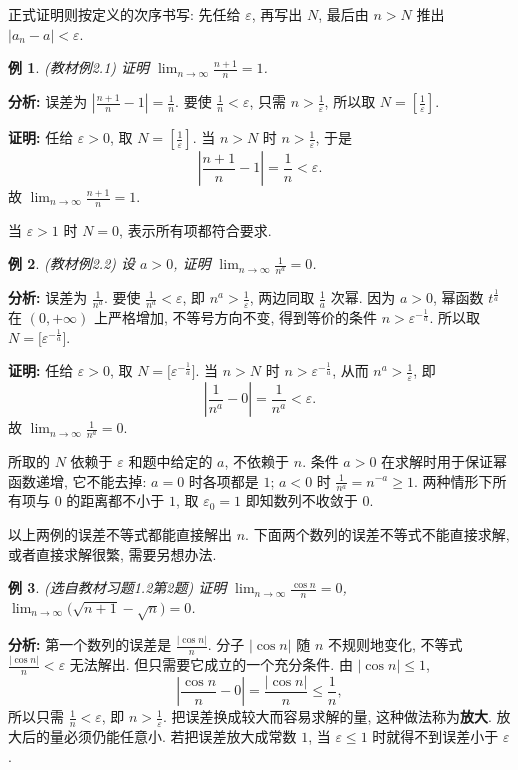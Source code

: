 \documentclass[UTF8,openany]{ctexbook}
\theoremstyle{chinesetextbook}
\newtheorem{example}{例}[section]
\newenvironment{cnproof}{\par\indent\textbf{证明:} \ignorespaces}{\par}
\begin{document}
正式证明则按定义的次序书写: 先任给 $\varepsilon$, 再写出 $N$, 最后由 $n>N$ 推出 $|a_n-a|<\varepsilon$.
\begin{example}\label{ex:2-1}
\textnormal{(教材例2.1)} 证明 $\displaystyle\lim_{n\to\infty}\frac{n+1}n=1$.
\end{example}
\par\indent\textbf{分析:} 误差为 $\displaystyle\left|\frac{n+1}n-1\right|=\frac1n$. 要使 $\displaystyle\frac1n<\varepsilon$, 只需 $\displaystyle n>\frac1\varepsilon$, 所以取 $\displaystyle N=\left[\frac1\varepsilon\right]$.
\begin{cnproof}
任给 $\varepsilon>0$, 取 $\displaystyle N=\left[\frac1\varepsilon\right]$. 当 $n>N$ 时 $\displaystyle n>\frac1\varepsilon$, 于是
\[
\left|\frac{n+1}n-1\right|=\frac1n<\varepsilon.
\]
故 $\displaystyle\lim_{n\to\infty}\frac{n+1}n=1$.
\end{cnproof}
当 $\varepsilon>1$ 时 $N=0$, 表示所有项都符合要求.
\begin{example}\label{ex:2-2}
\textnormal{(教材例2.2)} 设 $a>0$, 证明 $\displaystyle\lim_{n\to\infty}\frac1{n^a}=0$.
\end{example}
\par\indent\textbf{分析:} 误差为 $\displaystyle\frac1{n^a}$. 要使 $\displaystyle\frac1{n^a}<\varepsilon$, 即 $\displaystyle n^a>\frac1\varepsilon$, 两边同取 $\displaystyle\frac1a$ 次幂. 因为 $a>0$, 幂函数 $t^{\frac1a}$ 在 $(0,+\infty)$ 上严格增加, 不等号方向不变, 得到等价的条件 $n>\varepsilon^{-\frac1a}$. 所以取 $N=\bigl[\varepsilon^{-\frac1a}\bigr]$.
\begin{cnproof}
任给 $\varepsilon>0$, 取 $N=\bigl[\varepsilon^{-\frac1a}\bigr]$. 当 $n>N$ 时 $n>\varepsilon^{-\frac1a}$, 从而 $\displaystyle n^a>\frac1\varepsilon$, 即
\[
\left|\frac1{n^a}-0\right|=\frac1{n^a}<\varepsilon.
\]
故 $\displaystyle\lim_{n\to\infty}\frac1{n^a}=0$.
\end{cnproof}
所取的 $N$ 依赖于 $\varepsilon$ 和题中给定的 $a$, 不依赖于 $n$. 条件 $a>0$ 在求解时用于保证幂函数递增, 它不能去掉: $a=0$ 时各项都是 $1$; $a<0$ 时 $\displaystyle\frac1{n^a}=n^{-a}\ge1$. 两种情形下所有项与 $0$ 的距离都不小于 $1$, 取 $\varepsilon_0=1$ 即知数列不收敛于 $0$.

以上两例的误差不等式都能直接解出 $n$. 下面两个数列的误差不等式不能直接求解, 或者直接求解很繁, 需要另想办法.
\begin{example}\label{ex:h12-2}
\textnormal{(选自教材习题1.2第2题)} 证明 $\displaystyle\lim_{n\to\infty}\frac{\cos n}n=0$, $\displaystyle\lim_{n\to\infty}\bigl(\sqrt{n+1}-\sqrt n\bigr)=0$.
\end{example}
\par\indent\textbf{分析:} 第一个数列的误差是 $\displaystyle\frac{|\cos n|}n$. 分子 $|\cos n|$ 随 $n$ 不规则地变化, 不等式 $\displaystyle\frac{|\cos n|}n<\varepsilon$ 无法解出. 但只需要它成立的一个充分条件. 由 $|\cos n|\le1$,
\[
\left|\frac{\cos n}n-0\right|=\frac{|\cos n|}n\le\frac1n,
\]
所以只需 $\displaystyle\frac1n<\varepsilon$, 即 $\displaystyle n>\frac1\varepsilon$. 把误差换成较大而容易求解的量, 这种做法称为\textbf{放大}. 放大后的量必须仍能任意小. 若把误差放大成常数 $1$, 当 $\varepsilon\le1$ 时就得不到误差小于 $\varepsilon$.
\end{document}
